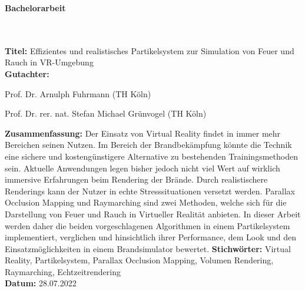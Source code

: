 \addtocounter{page}{1}

\begin{flushleft}
	\begin{huge}
		\textbf{Bachelorarbeit}
	\end{huge}
	~\\
	~\\
	\textbf{Titel:}  Effizientes und realistisches Partikelsystem zur Simulation von Feuer und Rauch in VR-Umgebung
	~\\
	\doublespacing
	\textbf{Gutachter:}
	\begin{description}
		\vspace{-0.2cm}
		\itemsep-8pt
		\item[–]
			Prof. Dr. Arnulph Fuhrmann (TH Köln)
		\item[–]
			Prof. Dr. rer. nat. Stefan Michael Grünvogel (TH Köln)
	\end{description}
	\vspace{-0.4cm}
	\singlespacing
	\textbf{Zusammenfassung:} Der Einsatz von Virtual Reality findet in immer mehr Bereichen
	seinen Nutzen. Im Bereich der Brandbekämpfung könnte die Technik eine sichere und
	kostengünstigere Alternative zu bestehenden Trainingsmethoden sein.
	Aktuelle Anwendungen legen bisher jedoch nicht viel Wert auf wirklich immersive Erfahrungen
	beim Rendering der Brände. Durch realistischere Renderings kann der Nutzer in echte Stresssituationen
	versetzt werden. Parallax Occlusion Mapping und Raymarching sind zwei Methoden, welche sich für die
	Darstellung von Feuer und Rauch in Virtueller Realität anbieten.
	In dieser Arbeit werden daher die beiden vorgeschlagenen Algorithmen in einem Partikelsystem implementiert, verglichen und
	hinsichtlich ihrer Performance, dem Look und den Einsatzmöglichkeiten in einem Brandsimulator bewertet.
	\singlespacing
	\textbf{Stichwörter:} Virtual Reality, Partikelsystem, Parallax Occlusion Mapping, Volumen Rendering, Raymarching, Echtzeitrendering\\
	\doublespacing
	\textbf{Datum:} 28.07.2022


	\vspace{1cm}


\end{flushleft}
